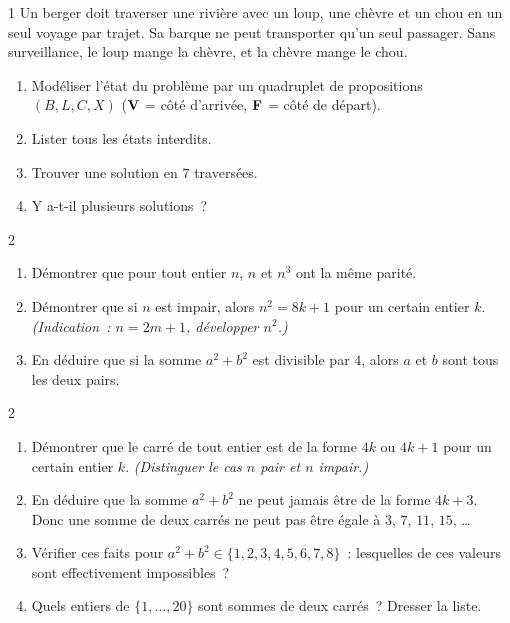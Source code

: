 \begin{probleme}{1}
Un berger doit traverser une rivi\`ere avec un loup, une ch\`evre et un chou
en un seul voyage par trajet. Sa barque ne peut transporter qu'un seul passager.
Sans surveillance, le loup mange la ch\`evre, et la ch\`evre mange le chou.
\begin{enumerate}
  \item Mod\'eliser l'\'etat du probl\`eme par un quadruplet de propositions
        $(B, L, C, X)$ ($\textbf{V}$ = c\^ot\'e d'arriv\'ee, $\textbf{F}$ = c\^ot\'e de d\'epart).
  \item Lister tous les \'etats interdits.
  \item Trouver une solution en $7$ traversées.
  \item Y a-t-il plusieurs solutions~?
\end{enumerate}
\end{probleme}

\begin{probleme}{2}
\begin{enumerate}
  \item D\'emontrer que pour tout entier $n$,
        $n$ et $n^3$ ont la m\^eme parit\'e.
  \item D\'emontrer que si $n$ est impair, alors $n^2 = 8k+1$
        pour un certain entier $k$.
        \emph{(Indication~: $n = 2m+1$, d\'evelopper $n^2$.)}
  \item En d\'eduire que si la somme $a^2 + b^2$ est divisible par $4$,
        alors $a$ et $b$ sont tous les deux pairs.
\end{enumerate}
\end{probleme}

\begin{probleme}{2}
\begin{enumerate}
  \item D\'emontrer que le carr\'e de tout entier est de la forme $4k$
        ou $4k+1$ pour un certain entier $k$.
        \emph{(Distinguer le cas $n$ pair et $n$ impair.)}
  \item En d\'eduire que la somme $a^2 + b^2$ ne peut jamais \^etre
        de la forme $4k+3$.
        Donc une somme de deux carr\'es ne peut pas \^etre \'egale \`a
        $3$, $7$, $11$, $15$, \ldots
  \item V\'erifier ces faits pour $a^2+b^2 \in \{1,2,3,4,5,6,7,8\}$~:
        lesquelles de ces valeurs sont effectivement impossibles~?
  \item Quels entiers de $\{1,\ldots,20\}$ sont sommes de deux carr\'es~?
        Dresser la liste.
\end{enumerate}
\end{probleme}

